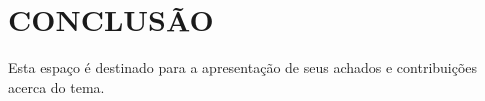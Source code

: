 \chapter{CONCLUSÃO}

Esta espaço é destinado para a apresentação de seus achados e contribuições acerca do tema.
